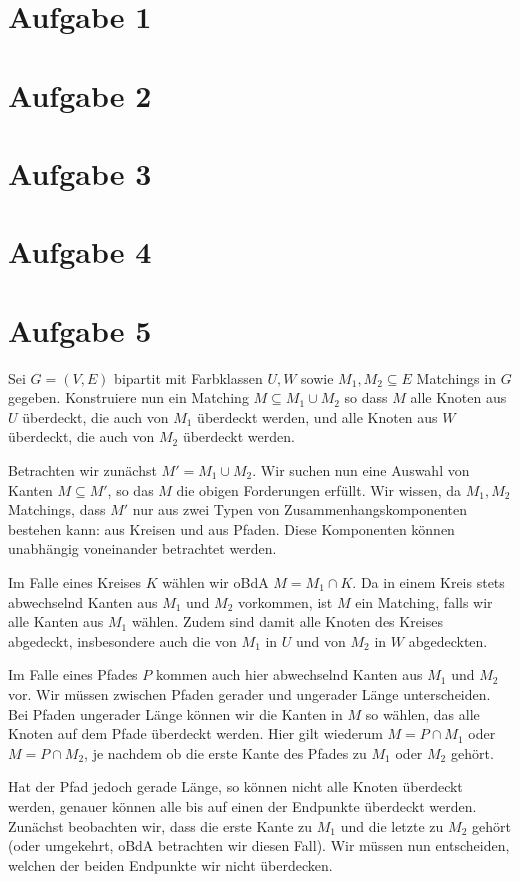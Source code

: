 \documentclass[a4paper]{article}
\begin{document}
\section{Aufgabe 1}
\section{Aufgabe 2}
\section{Aufgabe 3}
\section{Aufgabe 4}
\section{Aufgabe 5}
Sei $G = (V, E)$ bipartit mit Farbklassen $U, W$ sowie $M_1, M_2 \subseteq E$ Matchings in $G$
gegeben. Konstruiere nun ein Matching $M \subseteq M_1 \cup M_2$ so dass $M$
alle Knoten aus $U$ überdeckt, die auch von $M_1$ überdeckt werden, und alle
Knoten aus $W$ überdeckt, die auch von $M_2$ überdeckt werden.

Betrachten wir zunächst $M' = M_1 \cup M_2$. Wir suchen nun eine Auswahl von
Kanten $M \subseteq M'$, so das $M$ die obigen Forderungen erfüllt.
Wir wissen, da $M_1, M_2$
Matchings, dass $M'$ nur aus zwei Typen von Zusammenhangskomponenten
bestehen kann: aus Kreisen und aus Pfaden. Diese Komponenten können
unabhängig voneinander betrachtet werden.

Im Falle eines Kreises $K$ wählen wir oBdA $M = M_1 \cap K$. Da in einem
Kreis stets abwechselnd Kanten aus $M_1$ und $M_2$ vorkommen, ist $M$ ein
Matching, falls wir alle Kanten aus $M_1$ wählen. Zudem sind damit alle
Knoten des Kreises abgedeckt, insbesondere auch die von $M_1$ in $U$ und von
$M_2$ in $W$ abgedeckten.

Im Falle eines Pfades $P$ kommen auch hier abwechselnd Kanten aus $M_1$ und
$M_2$ vor. Wir müssen zwischen Pfaden gerader und ungerader Länge unterscheiden.
Bei Pfaden ungerader Länge können wir die Kanten in $M$ so wählen, das alle
Knoten auf dem Pfade überdeckt werden. Hier gilt wiederum $M = P \cap M_1$
oder $M = P \cap M_2$, je nachdem ob die erste Kante des Pfades zu $M_1$
oder $M_2$ gehört.

Hat der Pfad jedoch gerade Länge, so können nicht alle Knoten überdeckt
werden, genauer können alle bis auf einen der Endpunkte überdeckt werden.
Zunächst beobachten wir, dass die erste Kante zu $M_1$ und die
letzte zu $M_2$ gehört (oder umgekehrt, oBdA betrachten wir diesen Fall).
Wir müssen nun entscheiden, welchen der beiden Endpunkte wir nicht
überdecken.
\end{document}
